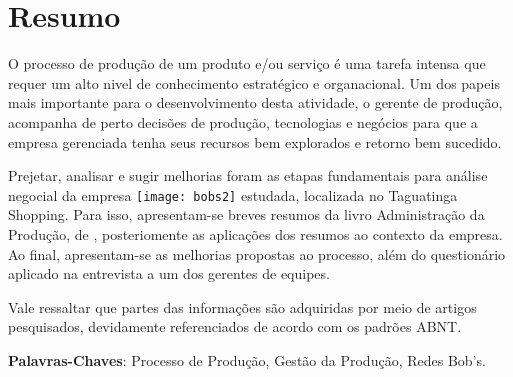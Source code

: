 \chapter[Resumo]{Resumo}
\label{chap:resumo}
	
	O processo de produção de um produto e/ou serviço é uma tarefa intensa que requer um alto nivel de conhecimento estratégico e organacional. Um dos papeis mais importante para o desenvolvimento desta atividade, o gerente de produção, acompanha de perto decisões de produção, tecnologias e negócios para que a empresa gerenciada tenha seus recursos bem explorados e retorno bem sucedido.

	Prejetar, analisar e sugir melhorias foram as etapas fundamentais para análise negocial da empresa \texttt{[image: bobs2]} estudada, localizada no Taguatinga Shopping. Para isso, apresentam-se breves resumos da livro Administração da Produção, de \cite{slack}, posteriomente as aplicações dos resumos ao contexto da empresa. Ao final, apresentam-se as melhorias propostas ao processo, além do questionário aplicado na entrevista a um dos gerentes de equipes.

	Vale ressaltar que partes das informações são adquiridas por meio de artigos pesquisados, devidamente referenciados de acordo com os padrões ABNT.

	\begin{flushleft}
		\textbf{Palavras-Chaves}: Processo de Produção, Gestão da Produção, Redes Bob's.
	\end{flushleft}
	